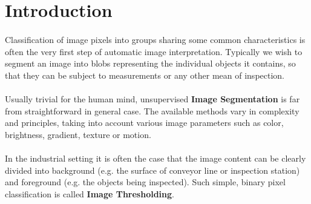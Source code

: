 \section{Introduction}

\paragraph*{}
Classification of image pixels into groups sharing some common characteristics is often the very first step of automatic image interpretation. Typically we wish to segment an image into blobs representing the individual objects it contains, so that they can be subject to measurements or any other mean of inspection. 

\paragraph*{}
Usually trivial for the human mind, unsupervised \textbf{Image Segmentation} is far from straightforward in general case. The available methods vary in complexity and principles, taking into account various image parameters such as color, brightness, gradient, texture or motion.

\paragraph*{}
In the industrial setting it is often the case that the image content can be clearly divided into background (e.g. the surface of conveyor line or inspection station) and foreground (e.g. the objects being inspected). Such simple, binary pixel classification is called \textbf{Image Thresholding}.
